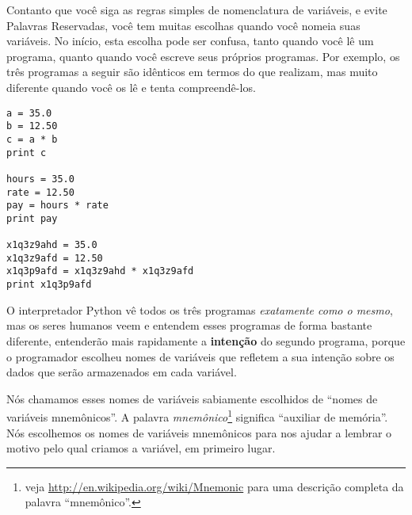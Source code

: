 {{{{{{{{{{{{{{{{{Contanto que você siga as regras simples de nomenclatura de variáveis, e evite 
Palavras Reservadas, você tem muitas escolhas quando você nomeia suas variáveis. 
No início, esta escolha pode ser confusa, tanto quando você lê um 
programa, quanto quando você escreve seus próprios programas. Por exemplo, os 
três programas a seguir são idênticos em termos do que realizam, 
mas muito diferente quando você os lê e tenta compreendê-los.

\beforeverb
\begin{verbatim}
a = 35.0
b = 12.50
c = a * b
print c

hours = 35.0
rate = 12.50
pay = hours * rate
print pay

x1q3z9ahd = 35.0
x1q3z9afd = 12.50
x1q3p9afd = x1q3z9ahd * x1q3z9afd
print x1q3p9afd
\end{verbatim}
\afterverb
%

O interpretador Python vê todos os três programas \emph{exatamente como o 
mesmo}, mas os seres humanos veem e entendem esses programas de forma bastante 
diferente, entenderão mais rapidamente a {\bf intenção} do segundo programa, porque o 
programador escolheu nomes de variáveis que refletem a sua intenção
sobre os dados que serão armazenados em cada variável.

Nós chamamos esses nomes de variáveis sabiamente escolhidos de ``nomes de 
variáveis mnemônicos''. A palavra \emph{mnemônico}\footnote{veja 
\url{http://en.wikipedia.org/wiki/Mnemonic} para uma descrição completa da 
palavra ``mnemônico''.} significa ``auxiliar de memória''. 
Nós escolhemos os nomes de variáveis mnemônicos para nos ajudar a lembrar o motivo 
pelo qual criamos a variável, em primeiro lugar.

}}}}}}}}}}}}}}}}}
